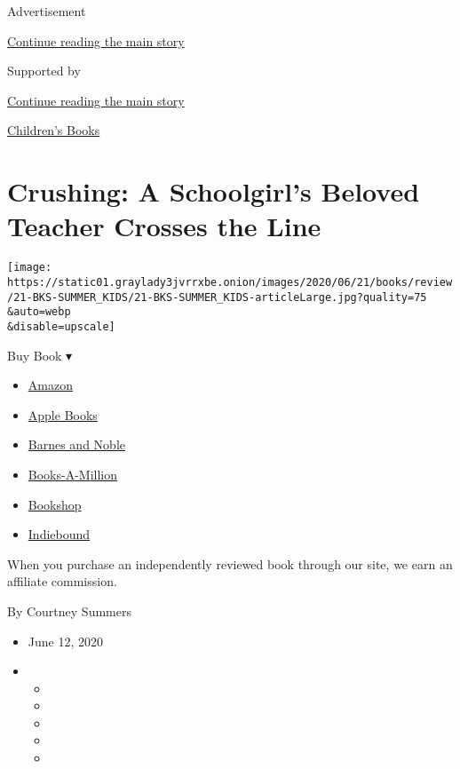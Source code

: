 Advertisement

\protect\hyperlink{after-top}{Continue reading the main story}

Supported by

\protect\hyperlink{after-sponsor}{Continue reading the main story}

\href{/column/childrens-books}{Children's Books}

\hypertarget{crushing-a-schoolgirls-beloved-teacher-crosses-the-line}{%
\section{Crushing: A Schoolgirl's Beloved Teacher Crosses the
Line}\label{crushing-a-schoolgirls-beloved-teacher-crosses-the-line}}

\texttt{[image: https://static01.graylady3jvrrxbe.onion/images/2020/06/21/books/review/21-BKS-SUMMER\_KIDS/21-BKS-SUMMER\_KIDS-articleLarge.jpg?quality=75\\\&auto=webp\\\&disable=upscale]}

Buy Book ▾

\begin{itemize}
\tightlist
\item
  \href{https://www.amazon.com/gp/search?index=books\&tag=NYTBSREV-20\&field-keywords=Rules+for+Being+a+Girl+Candace+Bushnell+and+Katie+Cotugno}{Amazon}
\item
  \href{https://du-gae-books-dot-nyt-du-prd.appspot.com/buy?title=Rules+for+Being+a+Girl\&author=Candace+Bushnell+and+Katie+Cotugno}{Apple
  Books}
\item
  \href{https://www.anrdoezrs.net/click-7990613-11819508?url=https\%3A\%2F\%2Fwww.barnesandnoble.com\%2Fw\%2F\%3Fean\%3D9780062803375}{Barnes
  and Noble}
\item
  \href{https://www.anrdoezrs.net/click-7990613-35140?url=https\%3A\%2F\%2Fwww.booksamillion.com\%2Fp\%2FRules\%2Bfor\%2BBeing\%2Ba\%2BGirl\%2FCandace\%2BBushnell\%2Band\%2BKatie\%2BCotugno\%2F9780062803375}{Books-A-Million}
\item
  \href{https://bookshop.org/a/3546/9780062803375}{Bookshop}
\item
  \href{https://www.indiebound.org/book/9780062803375?aff=NYT}{Indiebound}
\end{itemize}

When you purchase an independently reviewed book through our site, we
earn an affiliate commission.

By Courtney Summers

\begin{itemize}
\item
  June 12, 2020
\item
  \begin{itemize}
  \item
  \item
  \item
  \item
  \item
  \end{itemize}
\end{itemize}

